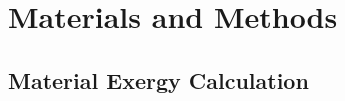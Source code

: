 \documentclass[energies,article,submit,pdftex,moreauthors]{Definitions/mdpi}
\begin{document}
\section{Materials and Methods}
\label{sec: materials and methods}

%
%
%
%

\subsection{Material Exergy Calculation}
\label{ssec: material exergy calculation}
%
\end{document}
